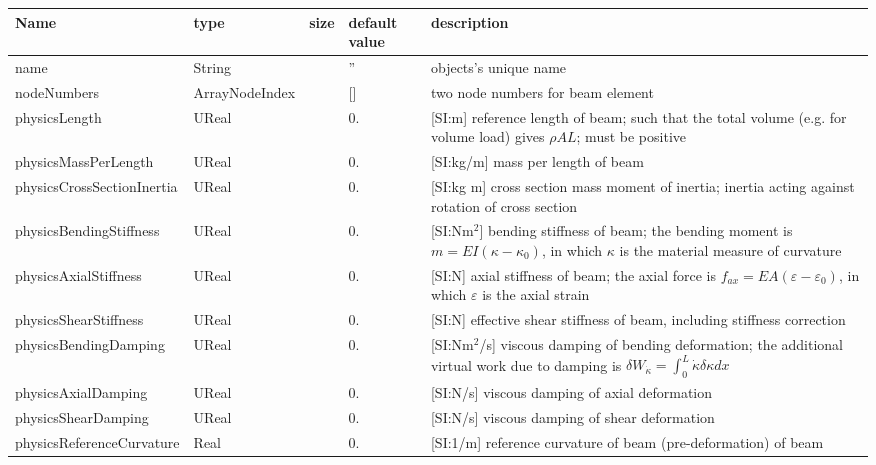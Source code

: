 \begin{center}
  \footnotesize
  \begin{longtable}{| p{4.5cm} | p{2.5cm} | p{0.5cm} | p{2.5cm} | p{6cm} |}
    \hline
    \bf Name & \bf type & \bf size & \bf default value & \bf description \\ \hline
    name &     String &      &     '' &     objects's unique name\\ \hline
    nodeNumbers &     ArrayNodeIndex &      &     [] &     two node numbers for beam element\\ \hline
    physicsLength &     UReal &      &     0. &      [SI:m] reference length of beam; such that the total volume (e.g. for volume load) gives $\rho A L$; must be positive\\ \hline
    physicsMassPerLength &     UReal &      &     0. &      [SI:kg/m] mass per length of beam\\ \hline
    physicsCrossSectionInertia &     UReal &      &     0. &      [SI:kg m] cross section mass moment of inertia; inertia acting against rotation of cross section\\ \hline
    physicsBendingStiffness &     UReal &      &     0. &      [SI:Nm$^2$] bending stiffness of beam; the bending moment is $m = EI (\kappa - \kappa_0)$, in which $\kappa$ is the material measure of curvature\\ \hline
    physicsAxialStiffness &     UReal &      &     0. &      [SI:N] axial stiffness of beam; the axial force is $f_{ax} = EA (\varepsilon -\varepsilon_0)$, in which $\varepsilon$ is the axial strain\\ \hline
    physicsShearStiffness &     UReal &      &     0. &      [SI:N] effective shear stiffness of beam, including stiffness correction\\ \hline
    physicsBendingDamping &     UReal &      &     0. &      [SI:Nm$^2$/s] viscous damping of bending deformation; the additional virtual work due to damping is $\delta W_{\dot \kappa} = \int_0^L \dot \kappa \delta \kappa dx$\\ \hline
    physicsAxialDamping &     UReal &      &     0. &      [SI:N/s] viscous damping of axial deformation\\ \hline
    physicsShearDamping &     UReal &      &     0. &      [SI:N/s] viscous damping of shear deformation\\ \hline
    physicsReferenceCurvature &     Real &      &     0. &      [SI:1/m] reference curvature of beam (pre-deformation) of beam\\ \hline

\end{longtable}
\end{center}
